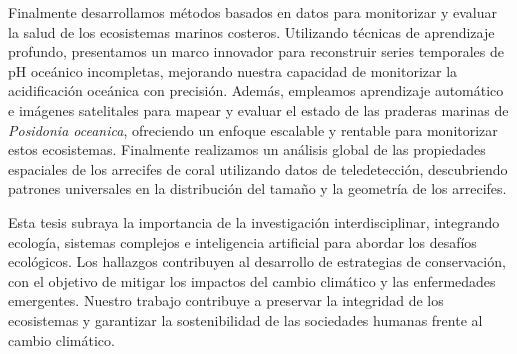 Finalmente desarrollamos métodos basados en datos para monitorizar y
evaluar la salud de los ecosistemas marinos costeros. Utilizando técnicas de
aprendizaje profundo, presentamos un marco innovador para reconstruir series
temporales de pH oceánico incompletas, mejorando nuestra capacidad de
monitorizar la acidificación oceánica con precisión. Además, empleamos
aprendizaje automático e imágenes satelitales para mapear y evaluar el estado
de las praderas marinas de \textit{Posidonia oceanica}, ofreciendo un enfoque
escalable y rentable para monitorizar estos ecosistemas. Finalmente
realizamos un análisis global de las propiedades espaciales de los arrecifes de
coral utilizando datos de teledetección, descubriendo patrones universales en
la distribución del tamaño y la geometría de los arrecifes.

Esta tesis subraya la importancia de la investigación interdisciplinar,
integrando ecología, sistemas complejos e inteligencia artificial para abordar
los desafíos ecológicos. Los hallazgos contribuyen al desarrollo de estrategias
de conservación, con el objetivo de mitigar los impactos del cambio climático y
las enfermedades emergentes. Nuestro trabajo contribuye a
preservar la integridad de los ecosistemas y garantizar la sostenibilidad de
las sociedades humanas frente al cambio climático.

\vfill